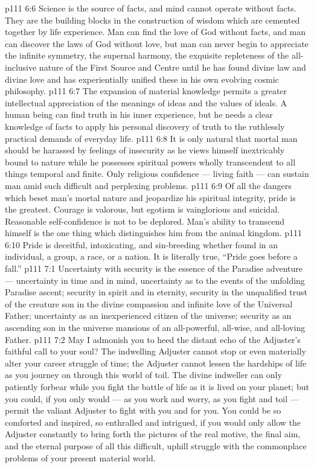 \vs p111 6:6 Science is the source of facts, and mind cannot operate without facts. They are the building blocks in the construction of wisdom which are cemented together by life experience. Man can find the love of God without facts, and man can discover the laws of God without love, but man can never begin to appreciate the infinite symmetry, the supernal harmony, the exquisite repleteness of the all\hyp{}inclusive nature of the First Source and Centre until he has found divine law and divine love and has experientially unified these in his own evolving cosmic philosophy.
\vs p111 6:7 The expansion of material knowledge permits a greater intellectual appreciation of the meanings of ideas and the values of ideals. A human being can find truth in his inner experience, but he needs a clear knowledge of facts to apply his personal discovery of truth to the ruthlessly practical demands of everyday life.
\vs p111 6:8 \pc It is only natural that mortal man should be harassed by feelings of insecurity as he views himself inextricably bound to nature while he possesses spiritual powers wholly transcendent to all things temporal and finite. Only religious confidence --- living faith --- can sustain man amid such difficult and perplexing problems.
\vs p111 6:9 \pc Of all the dangers which beset man’s mortal nature and jeopardize his spiritual integrity, pride is the greatest. Courage is valorous, but egotism is vainglorious and suicidal. Reasonable self\hyp{}confidence is not to be deplored. Man’s ability to transcend himself is the one thing which distinguishes him from the animal kingdom.
\vs p111 6:10 \pc Pride is deceitful, intoxicating, and sin\hyp{}breeding whether found in an individual, a group, a race, or a nation. It is literally true, “Pride goes before a fall.”
\vs p111 7:1 Uncertainty with security is the essence of the Paradise adventure --- uncertainty in time and in mind, uncertainty as to the events of the unfolding Paradise ascent; security in spirit and in eternity, security in the unqualified trust of the creature son in the divine compassion and infinite love of the Universal Father; uncertainty as an inexperienced citizen of the universe; security as an ascending son in the universe mansions of an all\hyp{}powerful, all\hyp{}wise, and all\hyp{}loving Father.
\vs p111 7:2 \pc May I admonish you to heed the distant echo of the Adjuster’s faithful call to your soul? The indwelling Adjuster cannot stop or even materially alter your career struggle of time; the Adjuster cannot lessen the hardships of life as you journey on through this world of toil. The divine indweller can only patiently forbear while you fight the battle of life as it is lived on your planet; but you could, if you only would --- as you work and worry, as you fight and toil --- permit the valiant Adjuster to fight with you and for you. You could be so comforted and inspired, so enthralled and intrigued, if you would only allow the Adjuster constantly to bring forth the pictures of the real motive, the final aim, and the eternal purpose of all this difficult, uphill struggle with the commonplace problems of your present material world.
